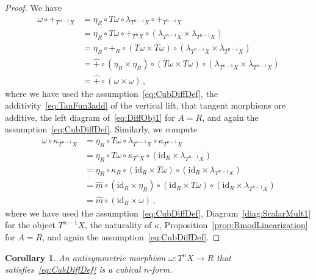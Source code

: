 \documentclass[12pt,reqno, a4paper]{amsart}
\numberwithin{equation}{section}
\theoremstyle{plain}
\newtheorem{Corollary}[Theorem]{Corollary}
\theoremstyle{definition}
\theoremstyle{remark}
\newcommand{\id}{\mathrm{id}}
\newcommand{\Val}{\eta}
\newcommand{\Rmult}{\hat{m}}
\newcommand{\Radd}{\hat{+}}
\begin{document}
\begin{proof}
We have
\begin{equation*}
\begin{split}
  \omega \circ +_{T^{n-1} X}
  &=
  \Val_R \circ T\omega \circ \lambda_{T^{n-1}X} \circ +_{T^{n-1} X}
  \\
  &=
  \Val_R \circ T\omega \circ 
  +_{T^n X} \circ (\lambda_{T^{n-1}X} \times \lambda_{T^{n-1}X})
  \\
  &=
  \Val_R \circ +_R \circ (T\omega \times T\omega) \circ 
  (\lambda_{T^{n-1}X} \times \lambda_{T^{n-1}X})
  \\
  &=
  \Radd \circ (\Val_R \times \Val_R) \circ 
  (T\omega \times T\omega) \circ 
  (\lambda_{T^{n-1}X} \times \lambda_{T^{n-1}X})
  \\
  &=
  \Radd \circ (\omega \times \omega)
  \,,
\end{split}
\end{equation*}
where we have used the assumption~\eqref{eq:CubDiffDef}, the additivity~\eqref{eq:TanFun3add} of the vertical lift, that tangent morphisms are additive, the left diagram of~\eqref{eq:DiffObj1} for $A = R$, and again the assumption~\eqref{eq:CubDiffDef}. Similarly, we compute
\begin{equation*}
\begin{split}
  \omega \circ \kappa_{T^{n-1} X}
  &=
  \Val_R \circ T\omega \circ \lambda_{T^{n-1}X} \circ 
  \kappa_{T^{n-1} X}
  \\
  &=
  \Val_R \circ T\omega \circ 
  \kappa_{T^n X} \circ (\id_R \times \lambda_{T^{n-1}X})
  \\
  &=
  \Val_R \circ \kappa_R \circ (\id_R \times T\omega) \circ 
  (\id_R \times \lambda_{T^{n-1}X})
  \\
  &=
  \Rmult \circ (\id_R \times \Val_R) \circ (\id_R \times T\omega) \circ 
  (\id_R \times \lambda_{T^{n-1}X})
  \\
  &=
  \Rmult \circ (\id_R \times \omega)
  \,,
\end{split}
\end{equation*}
where we have used the assumption~\eqref{eq:CubDiffDef}, Diagram~\eqref{diag:ScalarMult1} for the object $T^{n-1}X$, the naturality of $\kappa$, Proposition~\ref{prop:RmodLinearization} for $A=R$, and again the assumption~\eqref{eq:CubDiffDef}.
\end{proof}

\begin{Corollary}
An antisymmetric morphism $\omega: T^n X \to R$ that satisfies~\eqref{eq:CubDiffDef} is a cubical $n$-form.
\end{Corollary}
\end{document}
